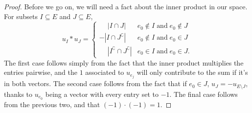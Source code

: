 \documentclass[12pt,oneside]{../../sfsuthesis}
\begin{document}
\begin{proof}
    Before we go on, we will need a fact about the inner product in our space.
    For subsets \( I \subseteq E \) and \( J \subseteq E \),
    \[
        u_{I} \ast u_{J} = \begin{cases}
            \phantom{-} | I \cap J |                         & e_0 \notin I \; \text{and} \; e_0 \notin J \\
            - | I \cap J^\complement |                       & e_0 \notin I \; \text{and} \; e_0 \in J    \\
            \phantom{-} | I^\complement \cap J^\complement | & e_0 \in I \; \text{and} \; e_0 \in J.
        \end{cases}
    \]
    The first case follows simply from the fact that the inner product multiplies the entries pairwise, and the \( 1 \) associated to \( u_{e_j} \) will only contribute to the sum if it's in both vectors.
    The second case follows from the fact that if \( e_0 \in J \),  \( u_J = - u_{E \setminus J} \), thanks to \( u_{e_0} \) being a vector with every entry set to \( -1 \).
    The final case follows from the previous two, and that \( (-1) \cdot (-1) = 1 \).


\end{proof}
\end{document}
